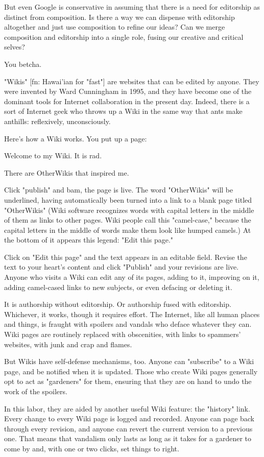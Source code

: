 But even Google is conservative in assuming that there is a need
for editorship as distinct from composition. Is there a way we can
dispense with editorship altogether and just use composition to
refine our ideas? Can we merge composition and editorship into a
single role, fusing our creative and critical selves?

You betcha.

"Wikis" [fn: Hawai'ian for "fast"] are websites that can be edited
by anyone. They were invented by Ward Cunningham in 1995, and they
have become one of the dominant tools for Internet collaboration in
the present day. Indeed, there is a sort of Internet geek who
throws up a Wiki in the same way that ants make anthills:
reflexively, unconsciously.

Here's how a Wiki works. You put up a page:

Welcome to my Wiki. It is rad.

There are OtherWikis that inspired me.

Click "publish" and bam, the page is live. The word "OtherWikis"
will be underlined, having automatically been turned into a link to
a blank page titled "OtherWikis" (Wiki software recognizes words
with capital letters in the middle of them as links to other pages.
Wiki people call this "camel-case," because the capital letters in
the middle of words make them look like humped camels.) At the
bottom of it appears this legend: "Edit this page."

Click on "Edit this page" and the text appears in an editable
field. Revise the text to your heart's content and click "Publish"
and your revisions are live. Anyone who visits a Wiki can edit any
of its pages, adding to it, improving on it, adding camel-cased
links to new subjects, or even defacing or deleting it.

It is authorship without editorship. Or authorship fused with
editorship. Whichever, it works, though it requires effort. The
Internet, like all human places and things, is fraught with
spoilers and vandals who deface whatever they can. Wiki pages are
routinely replaced with obscenities, with links to spammers'
websites, with junk and crap and flames.

But Wikis have self-defense mechanisms, too. Anyone can "subscribe"
to a Wiki page, and be notified when it is updated. Those who
create Wiki pages generally opt to act as "gardeners" for them,
ensuring that they are on hand to undo the work of the spoilers.

In this labor, they are aided by another useful Wiki feature: the
"history" link. Every change to every Wiki page is logged and
recorded. Anyone can page back through every revision, and anyone
can revert the current version to a previous one. That means that
vandalism only lasts as long as it takes for a gardener to come by
and, with one or two clicks, set things to right.


